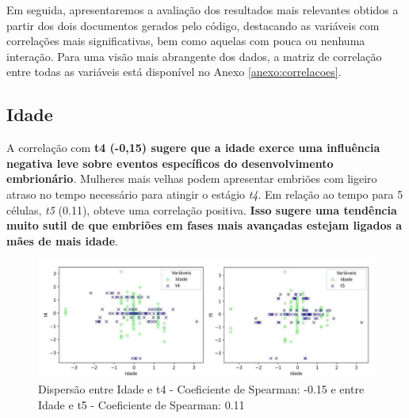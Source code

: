 Em seguida, apresentaremos a avaliação dos resultados mais relevantes obtidos a partir dos dois documentos gerados pelo código, destacando as variáveis com correlações mais significativas, bem como aquelas com pouca ou nenhuma interação. Para uma visão mais abrangente dos dados, a matriz de correlação entre todas as variáveis está disponível no Anexo \ref{anexo:correlacoes}.

\subsection*{Idade}
A correlação com \textbf{t4 (-0,15) sugere que a idade exerce uma influência negativa leve sobre eventos específicos do desenvolvimento embrionário}. Mulheres mais velhas podem apresentar embriões com ligeiro atraso no tempo necessário para atingir o estágio \textit{t4}. Em relação ao tempo para 5 células, \textit{t5} (0.11), obteve uma correlação positiva.\textbf{ Isso sugere uma tendência muito sutil de que embriões em fases mais avançadas estejam ligados a mães de mais idade}.

\begin{figure}[h]
    \captionsetup{font=footnotesize, justification=centering, labelsep=period, position=above}
    \label{fig:idade-t4-t5}
    \centering
    \includegraphics[scale=0.4]{figuras/Spearman/idade-t4-t5.pdf}
    \vspace{0.3cm} 
    \caption{Dispersão entre Idade e t4 - Coeficiente de Spearman: -0.15 e entre Idade e t5 - Coeficiente de Spearman: 0.11}
    \begin{minipage}{\linewidth}
        \centering
    \end{minipage}
\end{figure}
\FloatBarrier 

